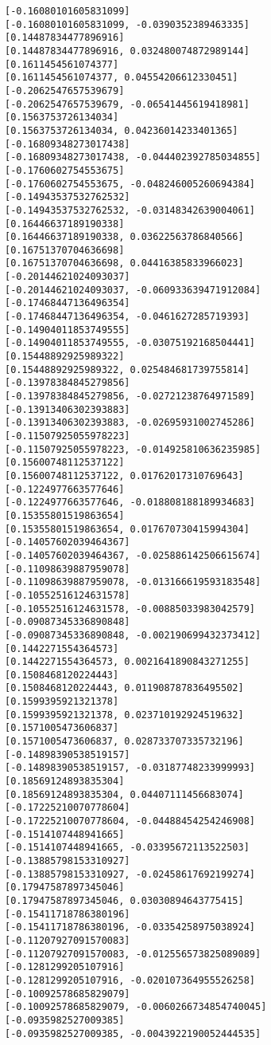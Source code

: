 \documentclass[11pt]{article}
\begin{document}
\begin{Verbatim}[commandchars=\\\{\}]
[-0.16080101605831099]
[-0.16080101605831099, -0.0390352389463335]
[0.14487834477896916]
[0.14487834477896916, 0.032480074872989144]
[0.1611454561074377]
[0.1611454561074377, 0.04554206612330451]
[-0.2062547657539679]
[-0.2062547657539679, -0.06541445619418981]
[0.1563753726134034]
[0.1563753726134034, 0.04236014233401365]
[-0.16809348273017438]
[-0.16809348273017438, -0.044402392785034855]
[-0.1760602754553675]
[-0.1760602754553675, -0.048246005260694384]
[-0.14943537532762532]
[-0.14943537532762532, -0.03148342639004061]
[0.16446637189190338]
[0.16446637189190338, 0.03622563786840566]
[0.16751370704636698]
[0.16751370704636698, 0.04416385833966023]
[-0.20144621024093037]
[-0.20144621024093037, -0.060933639471912084]
[-0.17468447136496354]
[-0.17468447136496354, -0.0461627285719393]
[-0.14904011853749555]
[-0.14904011853749555, -0.03075192168504441]
[0.15448892925989322]
[0.15448892925989322, 0.025484681739755814]
[-0.13978384845279856]
[-0.13978384845279856, -0.02721238764971589]
[-0.13913406302393883]
[-0.13913406302393883, -0.02695931002745286]
[-0.11507925055978223]
[-0.11507925055978223, -0.014925810636235985]
[0.15600748112537122]
[0.15600748112537122, 0.01762017310769643]
[-0.1224977663577646]
[-0.1224977663577646, -0.018808188189934683]
[0.15355801519863654]
[0.15355801519863654, 0.017670730415994304]
[-0.14057602039464367]
[-0.14057602039464367, -0.025886142506615674]
[-0.11098639887959078]
[-0.11098639887959078, -0.013166619593183548]
[-0.10552516124631578]
[-0.10552516124631578, -0.00885033983042579]
[-0.09087345336890848]
[-0.09087345336890848, -0.002190699432373412]
[0.1442271554364573]
[0.1442271554364573, 0.0021641890843271255]
[0.1508468120224443]
[0.1508468120224443, 0.011908787836495502]
[0.1599395921321378]
[0.1599395921321378, 0.023710192924519632]
[0.1571005473606837]
[0.1571005473606837, 0.028733707335732196]
[-0.14898390538519157]
[-0.14898390538519157, -0.03187748233999993]
[0.18569124893835304]
[0.18569124893835304, 0.04407111456683074]
[-0.17225210070778604]
[-0.17225210070778604, -0.04488454254246908]
[-0.1514107448941665]
[-0.1514107448941665, -0.03395672113522503]
[-0.13885798153310927]
[-0.13885798153310927, -0.02458617692199274]
[0.17947587897345046]
[0.17947587897345046, 0.03030894643775415]
[-0.15411718786380196]
[-0.15411718786380196, -0.03354258975038924]
[-0.11207927091570083]
[-0.11207927091570083, -0.012556573825089089]
[-0.1281299205107916]
[-0.1281299205107916, -0.020107364955526258]
[-0.10092578685829079]
[-0.10092578685829079, -0.0060266734854740045]
[-0.0935982527009385]
[-0.0935982527009385, -0.0043922190052444535]

\end{Verbatim}
\end{document}
